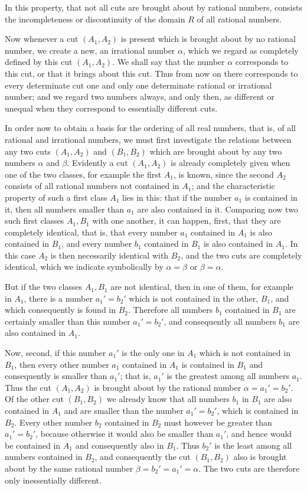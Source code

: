 \documentclass[11pt]{article}
\begin{document}
In this property, that not all cuts are brought about by rational numbers, consists the incompleteness or discontinuity of the domain $R$ of all rational numbers.

Now whenever a cut $(A_1,A_2)$ is present which is brought about by no rational number, we create a new, an irrational number $\alpha$, which we regard as completely defined by this cut $(A_1,A_2)$. We shall say that the number $\alpha$ corresponds to this cut, or that it brings about this cut. Thus from now on there corresponds to every determinate cut one and only one determinate rational or irrational number; and we regard two numbers always, and only then, as different or unequal when they correspond to essentially different cuts.

In order now to obtain a basis for the ordering of all real numbers, that is, of all rational and irrational numbers, we must first investigate the relations between any two cuts $(A_1,A_2)$ and $(B_1,B_2)$ which are brought about by any two numbers $\alpha$ and $\beta$. Evidently a cut $(A_1,A_2)$ is already completely given when one of the two classes, for example the first $A_1$, is known, since the second $A_2$ consists of all rational numbers not contained in $A_1$; and the characteristic property of such a first class $A_1$ lies in this: that if the number $a_1$ is contained in it, then all numbers smaller than $a_1$ are also contained in it. Comparing now two such first classes $A_1,B_1$ with one another, it can happen, first, that they are completely identical, that is, that every number $a_1$ contained in $A_1$ is also contained in $B_1$, and every number $b_1$ contained in $B_1$ is also contained in $A_1$. In this case $A_2$ is then necessarily identical with $B_2$, and the two cuts are completely identical, which we indicate symbolically by $\alpha=\beta$ or $\beta=\alpha$.

But if the two classes $A_1,B_1$ are not identical, then in one of them, for example in $A_1$, there is a number $a_1'=b_2'$ which is not contained in the other, $B_1$, and which consequently is found in $B_2$. Therefore all numbers $b_1$ contained in $B_1$ are certainly smaller than this number $a_1'=b_2'$, and consequently all numbers $b_1$ are also contained in $A_1$.

Now, second, if this number $a_1'$ is the only one in $A_1$ which is not contained in $B_1$, then every other number $a_1$ contained in $A_1$ is contained in $B_1$ and consequently is smaller than $a_1'$; that is, $a_1'$ is the greatest among all numbers $a_1$. Thus the cut $(A_1,A_2)$ is brought about by the rational number $\alpha=a_1'=b_2'$. Of the other cut $(B_1,B_2)$ we already know that all numbers $b_1$ in $B_1$ are also contained in $A_1$ and are smaller than the number $a_1'=b_2'$, which is contained in $B_2$. Every other number $b_2$ contained in $B_2$ must however be greater than $a_1'=b_2'$, because otherwise it would also be smaller than $a_1'$, and hence would be contained in $A_1$ and consequently also in $B_1$. Thus $b_2'$ is the least among all numbers contained in $B_2$, and consequently the cut $(B_1,B_2)$ also is brought about by the same rational number $\beta=b_2'=a_1'=\alpha$. The two cuts are therefore only inessentially different.
\end{document}
